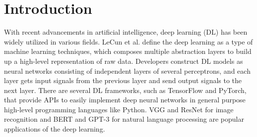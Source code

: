 \section{Introduction}\label{sec:intro}

With recent advancements in artificial intelligence, deep learning (DL) has
been widely utilized in various fields.
LeCun et al.\cite{LeCun2015} define the deep learning as a type of machine
learning techniques, which composes multiple abstraction layers to build up a
high-level representation of raw data. 
Developers construct DL models as neural networks consisting of independent
layers of several perceptrons, and each layer gets input signals from the
previous layer and send output signals to the next layer.
There are several DL frameworks, such as TensorFlow\cite{tensorflow} 
and PyTorch\cite{pytorch2019}, that provide
APIs to easily implement deep neural networks in general purpose high-level
programming languages like Python.
VGG\cite{vggnet2014} and ResNet\cite{resnet2015} for image recognition and
BERT\cite{bert2018} and GPT-3\cite{gpt32020} for natural language processing
are popular applications of the deep learning.


